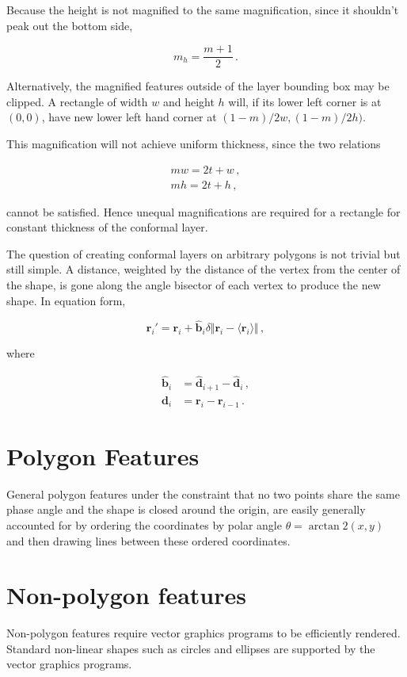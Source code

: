 \documentclass{article}
\begin{document}
Because the height is not magnified to the same magnification, since it shouldn't peak out the bottom side,

$$m_h = \frac{m+1}{2} \,. $$

Alternatively, the magnified features outside of the layer bounding box may be clipped. A rectangle of width $w$ and height $h$ will, if its lower left corner is at $(0,0)$, have new lower left hand corner at $(1-m)/2 w, (1-m)/2 h)$.

This magnification will not achieve uniform thickness, since the two relations

\begin{align*}
    mw = 2t + w \,,\\
    mh = 2t + h \,,
\end{align*}

cannot be satisfied. Hence unequal magnifications are required for a rectangle for constant thickness of the conformal layer. 

The question of creating conformal layers on arbitrary polygons is not trivial but still simple. A distance, weighted by the distance of the vertex from the center of the shape, is gone along the angle bisector of each vertex to produce the new shape. In equation form,

$$\mathbf{r}_i' = \mathbf{r}_i + \hat{\mathbf{b}}_i \delta \Vert \mathbf{r}_i - \langle \mathbf{r}_i \rangle \Vert \,, $$

where

\begin{align*}
\hat{\mathbf{b}}_i &= \hat{\mathbf{d}}_{i+1} - \hat{\mathbf{d}}_{i}\,, \\
\mathbf{d}_i &= \mathbf{r}_i - \mathbf{r}_{i-1} \,.
\end{align*}

\section{Polygon Features}
General polygon features under the constraint that no two points share the same phase angle and the shape is closed around the origin, are easily generally accounted for by ordering the coordinates by polar angle $\theta = \arctan2(x,y)$ and then drawing lines between these ordered coordinates.

\section{Non-polygon features}
Non-polygon features require vector graphics programs to be efficiently rendered. Standard non-linear shapes such as circles and ellipses are supported by the vector graphics programs. 
\end{document}
